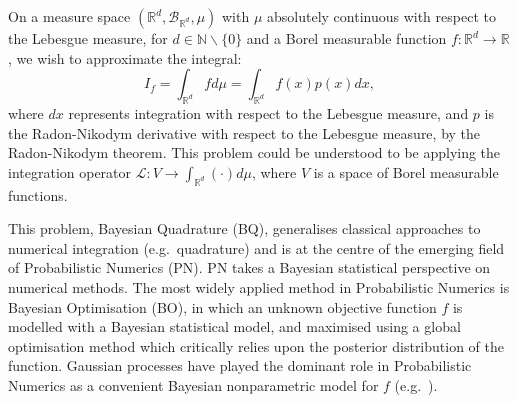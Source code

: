 On a measure space $(\mathbb{R}^d, \mathcal{B}_{\mathbb{R}^d}, \mu)$ with $\mu$ absolutely continuous with respect to the Lebesgue measure, for $d\in\mathbb{N}\backslash \{ 0\}$ and a Borel measurable function $f:\mathbb{R}^d \rightarrow \mathbb{R}$,
we wish to approximate the integral:
\begin{equation}
	I_f =\int_{\mathbb{R}^d} f d\mu = \int_{\mathbb{R}^d} f(x) p(x) dx,
\label{eq:integral}
\end{equation}
where $dx$ represents integration with respect to the Lebesgue measure, and $p$ is the Radon-Nikodym derivative with respect to the Lebesgue measure, by the Radon-Nikodym theorem. This problem could be understood to be applying the integration operator $\mathcal{L}:V \rightarrow \int_{\mathbb{R}^d} (\cdot) d\mu$, where $V$ is a space of  Borel measurable functions.

This problem, Bayesian Quadrature (BQ), generalises classical approaches to numerical integration (e.g.~quadrature) and is at the centre of the emerging field of Probabilistic Numerics (PN). PN takes a Bayesian statistical perspective on numerical methods. The most widely applied method in Probabilistic Numerics is Bayesian Optimisation (BO), in which an unknown objective function $f$ is modelled with a Bayesian statistical model, and maximised using a global optimisation method which critically relies upon the posterior distribution of the function. Gaussian processes  have played the dominant role in Probabilistic Numerics as a convenient Bayesian nonparametric model for $f$ (e.g.~\cite{Rasmussen:2002:BMC:2968618.2968681}). %

